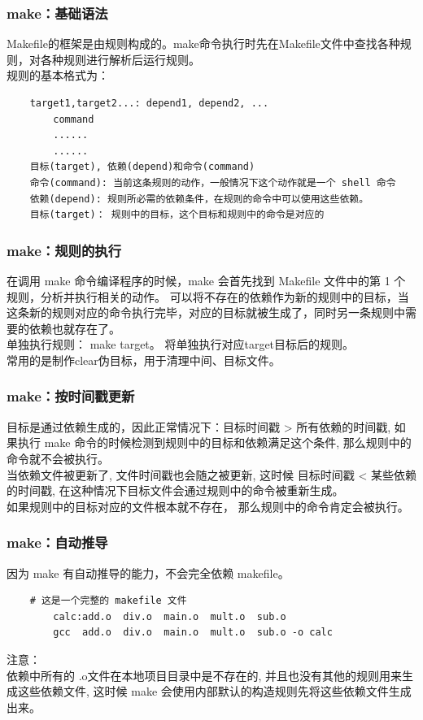 \documentclass[UTF8]{ctexart}
\begin{document}
\subsubsection{make：基础语法}
Makefile的框架是由规则构成的。make命令执行时先在Makefile文件中查找各种规则，对各种规则进行解析后运行规则。
\\
\indent 规则的基本格式为：
\begin{verbatim}
	target1,target2...: depend1, depend2, ...
		command
		......
		......
	目标(target), 依赖(depend)和命令(command)	
	命令(command): 当前这条规则的动作，一般情况下这个动作就是一个 shell 命令
	依赖(depend): 规则所必需的依赖条件，在规则的命令中可以使用这些依赖。
	目标(target)： 规则中的目标，这个目标和规则中的命令是对应的
\end{verbatim}

\subsubsection{make：规则的执行}
在调用 make 命令编译程序的时候，make 会首先找到 Makefile 文件中的第 1 个规则，分析并执行相关的动作。
可以将不存在的依赖作为新的规则中的目标，当这条新的规则对应的命令执行完毕，对应的目标就被生成了，同时另一条规则中需要的依赖也就存在了。
\\
\indent 单独执行规则：
make target。
将单独执行对应target目标后的规则。
\\
\indent 常用的是制作clear伪目标，用于清理中间、目标文件。

\subsubsection{make：按时间戳更新}
目标是通过依赖生成的，因此正常情况下：目标时间戳 > 所有依赖的时间戳, 如果执行 make 命令的时候检测到规则中的目标和依赖满足这个条件, 那么规则中的命令就不会被执行。
\\
\indent 当依赖文件被更新了, 文件时间戳也会随之被更新, 这时候 目标时间戳 < 某些依赖的时间戳, 在这种情况下目标文件会通过规则中的命令被重新生成。
\\
\indent	如果规则中的目标对应的文件根本就不存在， 那么规则中的命令肯定会被执行。

\subsubsection{make：自动推导}
因为 make 有自动推导的能力，不会完全依赖 makefile。
\begin{verbatim}
	# 这是一个完整的 makefile 文件
		calc:add.o  div.o  main.o  mult.o  sub.o
        gcc  add.o  div.o  main.o  mult.o  sub.o -o calc
\end{verbatim}
注意：\\
\indent 依赖中所有的 .o文件在本地项目目录中是不存在的, 并且也没有其他的规则用来生成这些依赖文件, 这时候 make 会使用内部默认的构造规则先将这些依赖文件生成出来。
\end{document}
